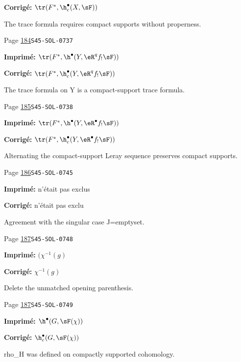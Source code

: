 \begin{description}
\par\noindent\textbf{Corrigé:} \(\tr(F^\ast,\h_c^\bullet(X,\sF))\)
\par\noindent The trace formula requires compact supports without properness.
\smallskip
\item[\hypertarget{apparatus:FR-0151}{151}] Page \hyperlink{printpage:fr:184}{184}\quad\texttt{S45-SOL-0737}
\par\noindent\textbf{Imprimé:} \(\tr(F^\ast, \h^\bullet(Y,\eR^q f_! \sF))\)
\par\noindent\textbf{Corrigé:} \(\tr(F^\ast,\h_c^\bullet(Y,\eR^q f_! \sF))\)
\par\noindent The trace formula on Y is a compact-support trace formula.
\smallskip
\item[\hypertarget{apparatus:FR-0152}{152}] Page \hyperlink{printpage:fr:185}{185}\quad\texttt{S45-SOL-0738}
\par\noindent\textbf{Imprimé:} \(\tr(F^\ast,\h^\bullet(Y,\eR^\bullet f_! \sF))\)
\par\noindent\textbf{Corrigé:} \(\tr(F^\ast,\h_c^\bullet(Y,\eR^\bullet f_! \sF))\)
\par\noindent Alternating the compact-support Leray sequence preserves compact supports.
\smallskip
\item[\hypertarget{apparatus:FR-0153}{153}] Page \hyperlink{printpage:fr:186}{186}\quad\texttt{S45-SOL-0745}
\par\noindent\textbf{Imprimé:} n'était pas exclus
\par\noindent\textbf{Corrigé:} n'était pas exclu
\par\noindent Agreement with the singular case J=emptyset.
\smallskip
\item[\hypertarget{apparatus:FR-0154}{154}] Page \hyperlink{printpage:fr:187}{187}\quad\texttt{S45-SOL-0748}
\par\noindent\textbf{Imprimé:} \((\chi^{-1}(g)\)
\par\noindent\textbf{Corrigé:} \(\chi^{-1}(g)\)
\par\noindent Delete the unmatched opening parenthesis.
\smallskip
\item[\hypertarget{apparatus:FR-0155}{155}] Page \hyperlink{printpage:fr:187}{187}\quad\texttt{S45-SOL-0749}
\par\noindent\textbf{Imprimé:} \(\h^\bullet(G,\sF(\chi))\)
\par\noindent\textbf{Corrigé:} \(\h_c^\bullet(G,\sF(\chi))\)
\par\noindent rho\_H was defined on compactly supported cohomology.

\end{description}
